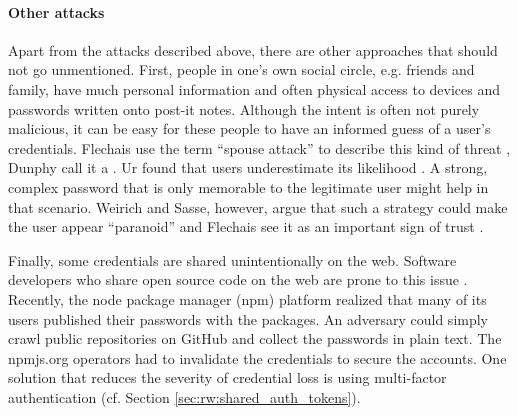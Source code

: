 \paragraph{Other attacks} 
Apart from the attacks described above, there are other approaches that should not go unmentioned. First, people in one's own social circle, e.g. friends and family, have much personal information and often physical access to devices and passwords written onto post-it notes. Although the intent is often not purely malicious, it can be easy for these people to have an informed guess of a user's credentials. Flechais \etal use the term ``spouse attack'' to describe this kind of threat \cite{Flechais2013SaudiArabiaTrust}, Dunphy \etal call it a . Ur \etal found that users underestimate its likelihood \cite{Ur2016PerceptionsPassword}. A strong, complex password that is only memorable to the legitimate user might help in that scenario. Weirich and Sasse, however, argue that such a strategy could make the user appear ``paranoid'' \cite{Weirich2001PrettyGoodPersuasion} and Flechais \etal see it as an important sign of trust \cite{Flechais2005DivideConquerTrust, Flechais2013SaudiArabiaTrust}. 
 
Finally, some credentials are shared unintentionally on the web. Software developers who share open source code on the web are prone to this issue \cite{Conklin2004PWAuthenticationSystemPerspective}. Recently, the node package manager (npm) platform realized that many of its users published their passwords with the packages. An adversary could simply crawl public repositories on GitHub and collect the passwords in plain text. The npmjs.org operators had to invalidate the credentials to secure the accounts. One solution that reduces the severity of credential loss is using multi-factor authentication (cf. Section \ref{sec:rw:shared_auth_tokens}).






